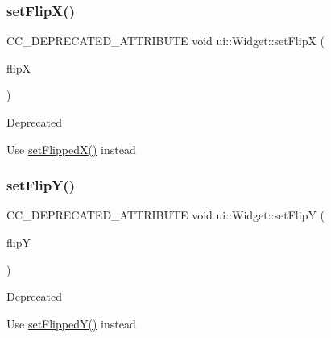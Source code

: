 \subsubsection{\texorpdfstring{set\+Flip\+X()}{setFlipX()}\hspace{0.1cm}{\footnotesize\ttfamily [2/2]}}
{\footnotesize\ttfamily C\+C\+\_\+\+D\+E\+P\+R\+E\+C\+A\+T\+E\+D\+\_\+\+A\+T\+T\+R\+I\+B\+U\+TE void ui\+::\+Widget\+::set\+FlipX (\begin{DoxyParamCaption}\item[{bool}]{flipX }\end{DoxyParamCaption})\hspace{0.3cm}{\ttfamily [inline]}}

\begin{DoxyRefDesc}{Deprecated}
\item[\hyperlink{deprecated__deprecated000408}{Deprecated}]Use \hyperlink{classui_1_1Widget_adeffb95b64ba85db92cc533457883194}{set\+Flipped\+X()} instead \end{DoxyRefDesc}
\mbox{\label{classui_1_1Widget_a89ae260075d6faacc1b7d76734f8f4d4}} 
\subsubsection{\texorpdfstring{set\+Flip\+Y()}{setFlipY()}\hspace{0.1cm}{\footnotesize\ttfamily [1/2]}}
{\footnotesize\ttfamily C\+C\+\_\+\+D\+E\+P\+R\+E\+C\+A\+T\+E\+D\+\_\+\+A\+T\+T\+R\+I\+B\+U\+TE void ui\+::\+Widget\+::set\+FlipY (\begin{DoxyParamCaption}\item[{bool}]{flipY }\end{DoxyParamCaption})\hspace{0.3cm}{\ttfamily [inline]}}

\begin{DoxyRefDesc}{Deprecated}
\item[\hyperlink{deprecated__deprecated000175}{Deprecated}]Use \hyperlink{classui_1_1Widget_add1302904325f3784a02d29e29f83c94}{set\+Flipped\+Y()} instead \end{DoxyRefDesc}
\mbox{\label{classui_1_1Widget_a89ae260075d6faacc1b7d76734f8f4d4}} 
